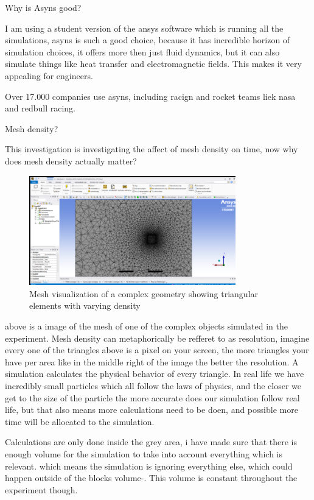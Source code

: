 \documentclass[12pt,a4paper]{article}
\begin{document}
Why is Asyns good?

I am using a student version of the ansys software which is running all the simulations, asyns is such a good choice, because it has incredible horizon of simulation choices, it offers more then just fluid dynamics, but it can also simulate things like heat transfer and electromagnetic fields. This makes it very appealing for engineers. 

Over 17.000 companies use asyns, including racign and rocket teams liek nasa and redbull racing.

Mesh density?

This investigation is investigating the affect of mesh density on time, now why does mesh density actually matter?

\begin{figure}[H]
    \centering
    \includegraphics[width=0.8\textwidth]{image9.png}
    \caption{Mesh visualization of a complex geometry showing triangular elements with varying density}
    \label{fig:mesh_example}
\end{figure}

above is a image of the mesh of one of the complex objects simulated in the experiment. Mesh density can metaphorically be refferet to as resolution, imagine every one of the triangles above is a pixel on your screen, the more triangles your have per area like in the middle right of the image the better the resolution. A simulation calculates the physical behavior of every triangle. In real life we have incredibly small particles which all follow the laws of physics, and the closer we get to the size of the particle the more accurate does our simulation follow real life, but that also means more calculations need to be doen, and possible more time will be allocated to the simulation.

Calculations are only done inside the grey area, i have made sure that there is enough volume for the simulation to take into account everything which is relevant. which means the simulation is ignoring everything else, which could happen outside of the blocks volume-. This volume is constant throughout the experiment though.
\end{document}
